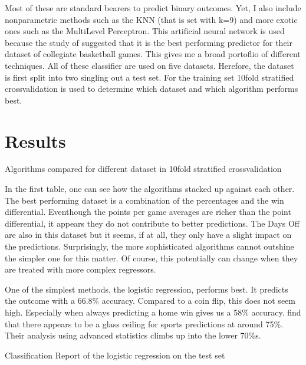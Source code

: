 \documentclass[11pt, a4paper, leqno]{article}
\begin{document}
Most of these are standard bearers to predict binary outcomes. Yet, I also include non\-parametric methods such as the KNN (that is set with k=9) and more exotic ones such as the Multi\-Level Perceptron. This artificial neural network is used because the study of \cite{Zimbo} suggested that it is the best performing predictor for their dataset of collegiate basketball games. This gives me a broad portoflio of different techniques. All of these classifier are used on five datasets. Herefore, the dataset is first split into two \- singling out a test set. For the training set 10\-fold stratified cross\-validation is used to determine which dataset and which algorithm performs best.

\section{Results}

\begin{table}

\caption{Algorithms compared for different dataset in 10\-fold stratified cross\-validation}
    

 \end{table}

In the first table, one can see how the algorithms stacked up against each other. The best performing dataset is a combination of the percentages and the win differential. Eventhough the points per game averages are richer than the point differential, it appears they do not contribute to better predictions. The Days Off are also in this dataset but it seems, if at all, they only have a slight impact on the predictions. Surprisingly, the more sophisticated algorithms cannot outshine the simpler one for this matter. Of course, this potentially can change when they are treated with more complex regressors.

One of the simplest methods, the logistic regression, performs best. It predicts the outcome with a 66.8\% accuracy. Compared to a coin flip, this does not seem high. Especially when always predicting a home win gives us a 58\% accuracy. \cite{Zimbo} find that there appears to be a glass ceiling for sports predictions at around 75\%. Their analysis using advanced statistics climbs up into the lower 70\%s.

\begin{table}

\caption{Classification Report of the logistic regression on the test set}
\centering
    

   \end{table}
\end{document}
